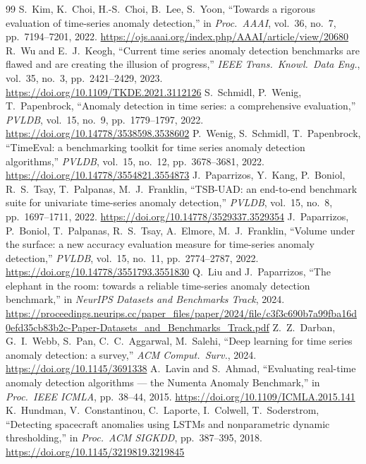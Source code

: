 \documentclass[10pt,twocolumn]{article}
\begin{document}
\begin{thebibliography}{99}\small
{} S.~Kim, K.~Choi, H.-S.~Choi, B.~Lee, S.~Yoon, ``Towards a rigorous evaluation of time-series anomaly detection,'' in \emph{Proc.\ AAAI}, vol.~36, no.~7, pp.~7194--7201, 2022. \url{https://ojs.aaai.org/index.php/AAAI/article/view/20680}
 R.~Wu and E.~J.~Keogh, ``Current time series anomaly detection benchmarks are flawed and are creating the illusion of progress,'' \emph{IEEE Trans.\ Knowl.\ Data Eng.}, vol.~35, no.~3, pp.~2421--2429, 2023. \url{https://doi.org/10.1109/TKDE.2021.3112126}
 S.~Schmidl, P.~Wenig, T.~Papenbrock, ``Anomaly detection in time series: a comprehensive evaluation,'' \emph{PVLDB}, vol.~15, no.~9, pp.~1779--1797, 2022. \url{https://doi.org/10.14778/3538598.3538602}
 P.~Wenig, S.~Schmidl, T.~Papenbrock, ``TimeEval: a benchmarking toolkit for time series anomaly detection algorithms,'' \emph{PVLDB}, vol.~15, no.~12, pp.~3678--3681, 2022. \url{https://doi.org/10.14778/3554821.3554873}
 J.~Paparrizos, Y.~Kang, P.~Boniol, R.~S.~Tsay, T.~Palpanas, M.~J.~Franklin, ``TSB-UAD: an end-to-end benchmark suite for univariate time-series anomaly detection,'' \emph{PVLDB}, vol.~15, no.~8, pp.~1697--1711, 2022. \url{https://doi.org/10.14778/3529337.3529354}
 J.~Paparrizos, P.~Boniol, T.~Palpanas, R.~S.~Tsay, A.~Elmore, M.~J.~Franklin, ``Volume under the surface: a new accuracy evaluation measure for time-series anomaly detection,'' \emph{PVLDB}, vol.~15, no.~11, pp.~2774--2787, 2022. \url{https://doi.org/10.14778/3551793.3551830}
 Q.~Liu and J.~Paparrizos, ``The elephant in the room: towards a reliable time-series anomaly detection benchmark,'' in \emph{NeurIPS Datasets and Benchmarks Track}, 2024. \url{https://proceedings.neurips.cc/paper_files/paper/2024/file/c3f3c690b7a99fba16d0efd35cb83b2c-Paper-Datasets_and_Benchmarks_Track.pdf}
 Z.~Z.~Darban, G.~I.~Webb, S.~Pan, C.~C.~Aggarwal, M.~Salehi, ``Deep learning for time series anomaly detection: a survey,'' \emph{ACM Comput.\ Surv.}, 2024. \url{https://doi.org/10.1145/3691338}
 A.~Lavin and S.~Ahmad, ``Evaluating real-time anomaly detection algorithms --- the Numenta Anomaly Benchmark,'' in \emph{Proc.\ IEEE ICMLA}, pp.~38--44, 2015. \url{https://doi.org/10.1109/ICMLA.2015.141}
 K.~Hundman, V.~Constantinou, C.~Laporte, I.~Colwell, T.~Soderstrom, ``Detecting spacecraft anomalies using LSTMs and nonparametric dynamic thresholding,'' in \emph{Proc.\ ACM SIGKDD}, pp.~387--395, 2018. \url{https://doi.org/10.1145/3219819.3219845}

\end{thebibliography}
\end{document}
